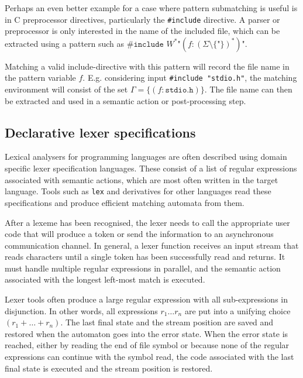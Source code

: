 Perhaps an even better example for a case where pattern submatching is useful is
in C preprocessor directives, particularly the \verb!#include! directive. A
parser or preprocessor is only interested in the name of the included file,
which can be extracted using a pattern such as $\texttt{\#include } W^*
\texttt{"} (f:(\Sigma \setminus \{\texttt{"}\})^*) \texttt{"}$.

Matching a valid include-directive with this pattern will record the file name
in the pattern variable $f$. E.g. considering input \verb!#include "stdio.h"!,
the matching environment will consist of the set $\Gamma = \{
(f:\texttt{stdio.h}) \}$. The file name can then be extracted and used in a
semantic action or post-processing step.

\subsection{Declarative lexer specifications}

Lexical analysers for programming languages are often described using domain
specific lexer specification languages. These consist of a list of regular
expressions associated with semantic actions, which are most often written in
the target language. Tools such as \texttt{lex} and derivatives for other
languages read these specifications and produce efficient matching automata from
them.

After a lexeme has been recognised, the lexer needs to call the appropriate user
code that will produce a token or send the information to an asynchronous
communication channel. In general, a lexer function receives an input stream
that reads characters until a single token has been successfully read and
returns. It must handle multiple regular expressions in parallel, and the
semantic action associated with the longest left-most match is executed.

Lexer tools often produce a large regular expression with all sub-expressions in
disjunction. In other words, all expressions $r_1 \dots r_n$ are put into a
unifying choice $(r_1 + \dots + r_n)$. The last final state and the stream
position are saved and restored when the automaton goes into the error state.
When the error state is reached, either by reading the end of file symbol or
because none of the regular expressions can continue with the symbol read, the
code associated with the last final state is executed and the stream position is
restored.

